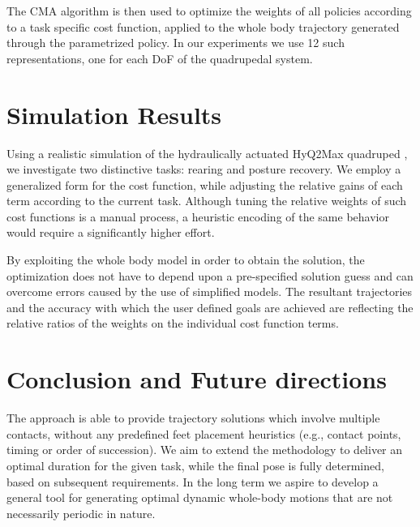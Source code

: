 \documentclass[usletter, 10pt, conference]{ieeeconf}      %
\begin{document}
The CMA algorithm is then used to optimize the weights of all 
policies according to a task specific cost function, applied to the 
whole body trajectory generated through the parametrized policy.
In our experiments we use 12 such representations, one for each DoF of the quadrupedal system. 



\section{Simulation Results}

Using a realistic simulation of the hydraulically actuated HyQ2Max quadruped \cite{semini16tmech}, 
we investigate two distinctive tasks: rearing and posture recovery. We employ a
generalized form for the cost function, while adjusting the relative gains of each term 
according to the current task. Although tuning the relative weights of such cost functions is a manual 
process, a heuristic encoding of the same behavior would require a significantly higher effort.

By exploiting the whole body model in order to obtain the solution, the optimization does not have
to depend upon a pre-specified solution guess and can overcome errors caused by the use of simplified models.
The resultant trajectories and the accuracy with which the user defined goals are achieved are 
reflecting the relative ratios of the weights on the individual cost function terms. 


\section{Conclusion and Future directions}

The approach is able to provide 
trajectory solutions which involve multiple contacts, without any predefined
feet placement heuristics (e.g., contact points, timing or order of succession). 
We aim to extend the methodology to deliver an optimal duration for the given task,
while the final pose is fully determined, based on
subsequent requirements. In the long term we aspire to develop a general tool for generating optimal dynamic 
whole-body motions that are not necessarily periodic in nature.



% 

\end{document}
